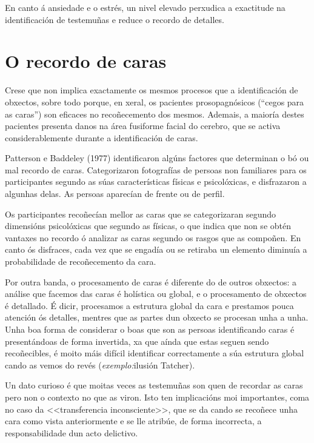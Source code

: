 \documentclass[a4paper,11pt]{article}
\begin{document}
\begin{itemize}
	En canto á ansiedade e o estrés, un nivel elevado perxudica a exactitude na identificación de
	testemuñas e reduce o recordo de detalles.
\end{itemize}

\section{O recordo de caras}
Crese que non implica exactamente os mesmos procesos que a identificación de obxectos, sobre todo porque, en xeral, os pacientes prosopagnósicos (``cegos para as caras'') son eficaces no recoñecemento dos mesmos. Ademais, a maioría destes pacientes presenta danos na área fusiforme facial do cerebro, que se activa considerablemente durante a identificación de caras.

Patterson e Baddeley (1977) identificaron algúns factores que determinan o bó ou mal recordo de caras. Categorizaron fotografías de persoas non familiares para os participantes segundo as súas características físicas e psicolóxicas, e disfrazaron a algunhas delas. As persoas aparecían de frente ou de perfil.

Os participantes recoñecían mellor as caras que se categorizaran segundo dimensións psicolóxicas que segundo as físicas, o que indica que non se obtén vantaxes no recordo ó analizar as caras segundo os rasgos que as compoñen. En canto ós disfraces, cada vez que se engadía ou se retiraba un elemento diminuía a probabilidade de recoñecemento da cara.

Por outra banda, o procesamento de caras é diferente do de outros obxectos: a análise que facemos das caras é holística ou global, e o procesamento de obxectos é detallado. É dicir, procesamos a estrutura global da cara e prestamos pouca atención ós detalles, mentres que as partes dun obxecto se procesan unha a unha. Unha boa forma de considerar o boas que son as persoas identificando caras é presentándoas de forma invertida, xa que aínda que estas seguen sendo recoñecibles, é moito máis difícil identificar correctamente a súa estrutura global cando as vemos do revés (\textit{exemplo:}ilusión Tatcher).

Un dato curioso é que moitas veces as testemuñas son quen de recordar as caras pero non o contexto no que as viron. Isto ten implicacións moi importantes, coma no caso da <<transferencia inconsciente>>, que se da cando se recoñece unha cara como vista anteriormente e se lle atribúe, de forma incorrecta, a responsabilidade dun acto delictivo.
\end{document}

